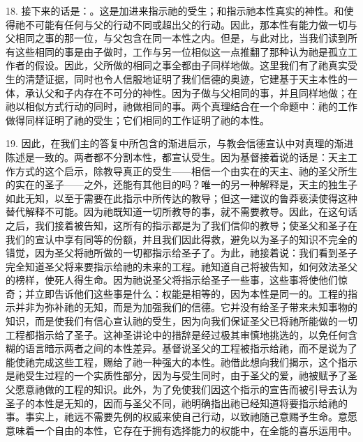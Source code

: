 18. 接下来的话是：。这是加进来指示祂的受生；和指示祂本性真实的神性。和使得祂不可能有任何与父的行动不同或超出父的行动。因此，那本性有能力做一切与父相同之事的那一位，与父包含在同一本性之内。但是，与此对比，当我们读到所有这些相同的事是由子做时，工作与另一位相似这一点推翻了那种认为祂是孤立工作者的假设。因此，父所做的相同之事全都由子同样地做。这里我们有了祂真实受生的清楚证据，同时也令人信服地证明了我们信德的奥迹，它建基于天主本性的一体，承认父和子内存在不可分的神性。因为子做与父相同的事，并且同样地做；在祂以相似方式行动的同时，祂做相同的事。两个真理结合在一个命题中：祂的工作做得同样证明了祂的受生；它们相同的工作证明了祂的本性。\par

19. 因此，在我们主的答复中所包含的渐进启示，与教会信德宣认中对真理的渐进陈述是一致的。两者都不分割本性，都宣认受生。因为基督接着说的话是：天主工作方式的这个启示，除教导真正的受生——相信一个由实在的天主、祂的圣父所生的实在的圣子——之外，还能有其他目的吗？唯一的另一种解释是，天主的独生子如此无知，以至于需要在此指示中所传达的教导；但这一建议的鲁莽亵渎使得这种替代解释不可能。因为祂既知道一切所教导的事，就不需要教导。因此，在这句话之后，我们接着被告知，这所有的指示都是为了我们信仰的教导；使圣父和圣子在我们的宣认中享有同等的份额，并且我们因此得救，避免以为圣子的知识不完全的错觉，因为圣父将祂所做的一切都指示给圣子了。为此，祂接着说：我们看到圣子完全知道圣父将来要指示给祂的未来的工程。祂知道自己将被告知，如何效法圣父的榜样，使死人得生命。因为祂说圣父将指示给圣子一些事，这些事将使他们惊奇；并立即告诉他们这些事是什么：权能是相等的，因为本性是同一的。工程的指示并非为弥补祂的无知，而是为加强我们的信德。它并没有给圣子带来未知事物的知识，而是使我们有信心宣认祂的受生，因为向我们保证圣父已将祂所能做的一切工程都指示给了圣子。这神圣讲论中的措辞是经过极其审慎地挑选的，以免任何含糊的语言暗示两者之间的本性差异。基督说圣父的工程被指示给祂，而不是说为了能使祂完成这些工程，赐给了祂一种强大的本性。祂借此想向我们揭示，这个指示是祂受生过程的一个实质性部分，因为与受生同时，由于圣父的爱，祂被赋予了圣父愿意祂做的工程的知识。此外，为了免使我们因这个指示的宣告而被引导去认为圣子的本性是无知的，因而与圣父不同，祂明确指出祂已经知道将要指示给祂的事。事实上，祂远不需要先例的权威来使自己行动，以致祂随己意赐予生命。意愿意味着一个自由的本性，它存在于拥有选择能力的权能中，在全能的喜乐运用中。\par

